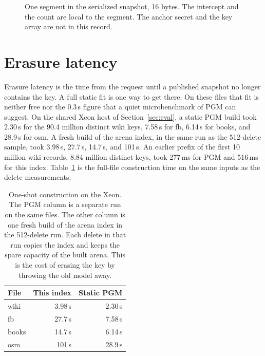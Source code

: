 \documentclass[conference]{IEEEtran}
\begin{document}
\begin{figure}[t]
\centering
{}
\caption{One segment in the serialized snapshot, 16 bytes.
The intercept and the count are local to the segment.
The anchor secret and the key array are not in this record.}
\label{fig:layout}
\end{figure}

\section{Erasure latency}
\label{sec:latency}

Erasure latency is the time from the request until a published snapshot no longer contains the key.
A full static fit is one way to get there.
On these files that fit is neither free nor the 0.3\,s figure that a quiet microbenchmark of PGM can suggest.
On the shared Xeon host of Section~\ref{sec:eval}, a static PGM build took 2.30\,s for the 90.4 million distinct wiki keys, 7.58\,s for fb, 6.14\,s for books, and 28.9\,s for osm.
A fresh build of the arena index, in the same run as the 512-delete sample, took 3.98\,s, 27.7\,s, 14.7\,s, and 101\,s.
An earlier prefix of the first 10 million wiki records, 8.84 million distinct keys, took 277\,ms for PGM and 516\,ms for this index.
Table~\ref{tab:build} is the full-file construction time on the same inputs as the delete measurements.

\begin{table}[t]
\caption{One-shot construction on the Xeon.
The PGM column is a separate run on the same files.
The other column is one fresh build of the arena index in the 512-delete run.
Each delete in that run copies the index and keeps the spare capacity of the built arena.
This is the cost of erasing the key by throwing the old model away.}
\label{tab:build}
\centering
\footnotesize
\begin{tabular}{@{}lrr@{}}
\toprule
File & This index & Static PGM \\
\midrule
wiki  & 3.98\,s & 2.30\,s \\
fb    & 27.7\,s & 7.58\,s \\
books & 14.7\,s & 6.14\,s \\
osm   & 101\,s & 28.9\,s \\
\bottomrule
\end{tabular}
\end{table}
\end{document}
